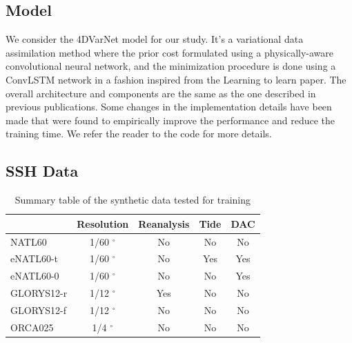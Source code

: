 \documentclass[draft]{agujournal2019}
\begin{document}
\subsection{Model}
\label{ssec:4dvarnet}
We consider the 4DVarNet model for our study. It's a variational data assimilation method where the prior cost formulated using a physically-aware convolutional neural network, and the minimization procedure is done using a ConvLSTM network in a fashion inspired from the Learning to learn paper.
The overall architecture and components are the same as the one described in previous publications. Some changes in the implementation details have been made that were found to empirically improve the performance and reduce the training time. We refer the reader to the code for more details.


\subsection{SSH Data}

\label{ssec:data}

\begin{table}[h]
    \centering
\begin{tabular}{|l||cccc|}
\toprule
{} & Resolution & Reanalysis & Tide & DAC  \\
\midrule
NATL60 \cite{ajayiSpatialTemporalVariability2020}               &      1/60 $^\circ$ &               No &            No &                   No  \\
eNATL60-t \cite{brodeauOceannextENATL60Material2020}         &      1/60 $^\circ$ &               No &           Yes &                  Yes  \\
eNATL60-0 \cite{brodeauOceannextENATL60Material2020}         &      1/60 $^\circ$ &               No &            No &                  Yes  \\
GLORYS12-r \cite{jean-michelCopernicusGlobal122021} &      1/12 $^\circ$ &              Yes &            No &                   No  \\
GLORYS12-f \cite{jean-michelCopernicusGlobal122021}   &      1/12 $^\circ$ &               No &            No &                   No  \\
ORCA025 \cite{bernardImpactPartialSteps2006}             &       1/4 $^\circ$ &               No &            No &                   No  \\
\bottomrule
\end{tabular}
\caption{Summary table of the synthetic data tested for training}
\label{tab:data}
\end{table}
\end{document}

